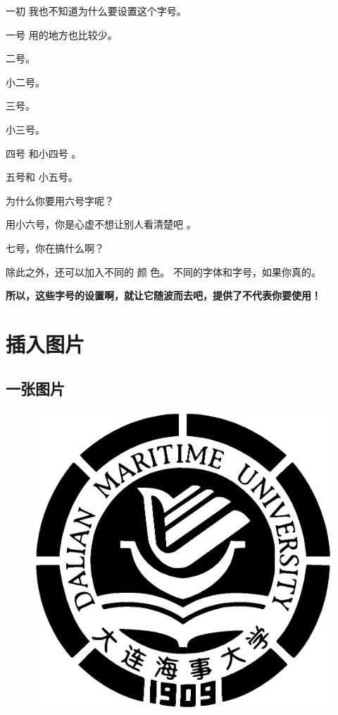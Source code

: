 {\yichu 一初} 我也不知道为什么要设置这个字号。
 
{\yihao 一号} 用的地方也比较少。
  
{\erhao 二号}。

{\xiaoerhao 小二号}。

{\sanhao 三号}。

{\xiaosanhao 小三号}。

{\sihao 四号} 和{\xiaosihao 小四号} 。

{\wuhao 五号}和 {\xiaowuhao 小五号}。
 
{\liuhao 为什么你要用六号字呢？} 

{\xiaoliuhao 用小六号，你是心虚不想让别人看清楚吧} 。

{\qihao 七号，你在搞什么啊？} 

除此之外，还可以加入不同的{\color {blue} 颜}  {\color {cyan} 色}。{ \sihao 不同的\kaiti 字体\fangsong  和字号，{\color{yellow}如果}你真的}。


\textbf{所以，这些字号的设置啊，就让它随波而去吧，提供了不代表你要使用！}
\section{插入图片}
\subsection{一张图片}

\begin{figure}[H]
\centering
\includegraphics[scale=0.4]{figs/dmu-logo.eps}
\label{fig:single}
\end{figure}


